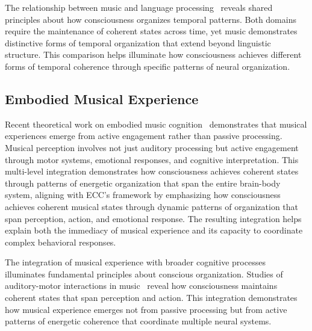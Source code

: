 The relationship between music and language processing~\cite{Patel2010, hunt2024electromagnetic} reveals shared principles about how consciousness organizes temporal patterns. Both domains require the maintenance of coherent states across time, yet music demonstrates distinctive forms of temporal organization that extend beyond linguistic structure. This comparison helps illuminate how consciousness achieves different forms of temporal coherence through specific patterns of neural organization.

\subsection*{Embodied Musical Experience}
Recent theoretical work on embodied music cognition~\cite{Krueger2009, zheng2025unbearable, Reybrouck2005, kukushkin2024massed} demonstrates that musical experiences emerge from active engagement rather than passive processing. Musical perception involves not just auditory processing but active engagement through motor systems, emotional responses, and cognitive interpretation. This multi-level integration demonstrates how consciousness achieves coherent states through patterns of energetic organization that span the entire brain-body system, aligning with ECC's framework by emphasizing how consciousness achieves coherent musical states through dynamic patterns of organization that span perception, action, and emotional response. The resulting integration helps explain both the immediacy of musical experience and its capacity to coordinate complex behavioral responses.

The integration of musical experience with broader cognitive processes illuminates fundamental principles about conscious organization. Studies of auditory-motor interactions in music~\cite{Zatorre2007, bosl2025dynamical} reveal how consciousness maintains coherent states that span perception and action. This integration demonstrates how musical experience emerges not from passive processing but from active patterns of energetic coherence that coordinate multiple neural systems.

